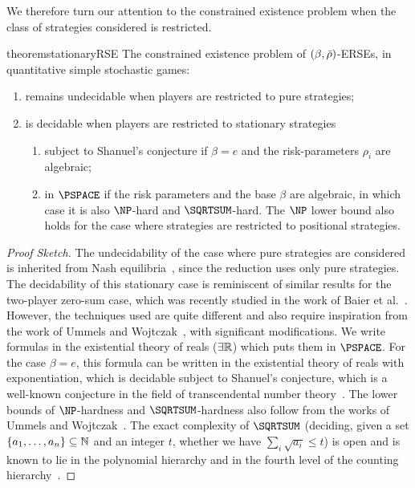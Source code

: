 We therefore turn our attention to the constrained existence problem when the class of strategies considered is restricted. 

\begin{restatable}{theorem}{stationaryRSE}\label{thm:ERRSErestricted}
The constrained existence problem of $(\beta,{\bar{\rho}})$-ERSEs, in quantitative simple stochastic games:
\begin{enumerate}
    \item remains undecidable when players are restricted to pure strategies;\label{itm:ERRSEitmundec} %
    \item is decidable when players are restricted to stationary strategies\label{itm:ERRSEdecidable}
\begin{enumerate}
        \item subject to Shanuel's conjecture if $\beta = e$ and the risk-parameters $\rho_i$ are algebraic;\label{itm:ERRSEitmShanuel}
        \item in $\PSPACE$ if the risk parameters and the base $\beta$ are algebraic, in which case it is also $\NP$-hard and $\SQRTSUM$-hard.\label{itm:ERRSE:PSPACE}
        The $\NP$ lower bound also holds for the case where strategies are restricted to positional strategies.
    \end{enumerate}
\end{enumerate}
\end{restatable}

\begin{proof}[Proof Sketch]
    The undecidability of the case where pure strategies are considered is inherited from Nash equilibria~\cite[Theorem~4.9]{UW11}, since the reduction uses only pure strategies. 
        The decidability of this stationary case is reminiscent of similar results for the two-player zero-sum case, which was recently studied in the work of Baier et al.~\cite{BCMP24}.
    However, the techniques used are quite different and also require inspiration from the work of Ummels and Wojtczak~\cite[Theorem 4.5, Theorem 4.6]{UW11}, with significant modifications. 
    We write formulas in the existential theory of reals ($\exists\mathbb{R}$) which puts them in $\PSPACE$. 
    For the case $\beta = e$, this formula can be written in the existential theory of reals with exponentiation, which is decidable subject to Shanuel's conjecture, which is a well-known conjecture in the field of transcendental number theory~\cite{Lan66}. The lower bounds of $\NP$-hardness and $\SQRTSUM$-hardness  also follow from the works of Ummels and Wojtczak~\cite[Theorem~4.4,Theorem~4.6]{UW11}. The exact complexity of $\SQRTSUM$ (deciding, given a set $\{a_1, \dots, a_n\} \subseteq \mathbb{N}$ and an integer $t$, whether we have $\sum_i \sqrt{a_i} \leq t$) is open and is known to lie in the polynomial hierarchy and in the fourth level of the counting hierarchy~\cite{AKBM06}. 
\end{proof}



